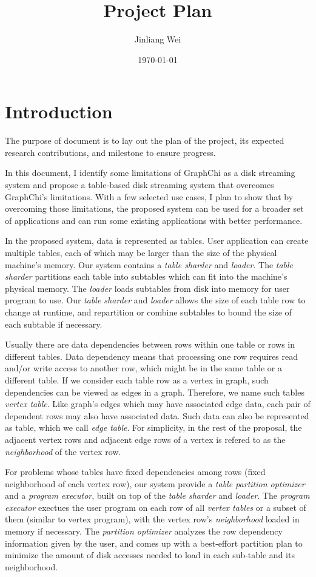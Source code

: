 \documentclass[10pt, twocolumn, a4paper]{article}
\title{\Large \bf Project Plan}
\author{Jinliang Wei}
\date{\today}
\begin{document}
\maketitle
\section{Introduction}
The purpose of document is to lay out the plan of the project, its expected research contributions, and milestone to ensure progress. 

In this document, I identify some limitations of GraphChi as a disk streaming system and propose a table-based disk streaming system that overcomes GraphChi's limitations. With a few selected use cases, I plan to show that by overcoming those limitations, the proposed system can be used for a broader set of applications and can run some existing applications with better performance.

In the proposed system, data is represented as tables. User application can create multiple tables, each of which may be larger than the size of the physical machine's memory. Our system contains a \emph{table sharder} and \emph{loader}. The \emph{table sharder} partitions each table into subtables which can fit into the machine's physical memory. The \emph{loader} loads subtables from disk into memory for user program to use. Our \emph{table sharder} and \emph{loader} allows the size of each table row to change at runtime, and repartition or combine subtables to bound the size of each subtable if necessary.

Usually there are data dependencies between rows within one table or rows in different tables. Data dependency means that processing one row requires read and/or write access to another row, which might be in the same table or a different table. If we consider each table row as a vertex in graph, such dependencies can be viewed as edges in a graph. Therefore, we name such tables \emph{vertex table}. Like graph's edges which may have associated edge data, each pair of dependent rows may also have associated data. Such data can also be represented as table, which we call \emph{edge table}. For simplicity, in the rest of the proposal, the adjacent vertex rows and adjacent edge rows of a vertex is refered to as the \emph{neighborhood} of the vertex row.

For problems whose tables have fixed dependencies among rows (fixed neighborhood of each vertex row), our system provide a \emph{table partition optimizer} and a \emph{program executor}, built on top of the \emph{table sharder} and \emph{loader}. The \emph{program executor} exectues the user program on each row of all \emph{vertex tables} or a subset of them (similar to vertex program), with the vertex row's \emph{neighborhood} loaded in memory if necessary. The \emph{partition optimizer} analyzes the row dependency information given by the user, and comes up with a best-effort partition plan to minimize the amount of disk accesses needed to load in each sub-table and its neighborhood.
\end{document}

